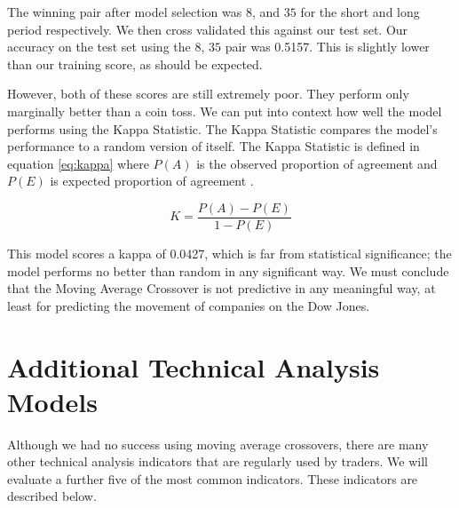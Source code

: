 \documentclass{report}
\begin{document}
The winning pair after model selection was $8$, and $35$ for the short and long period respectively. We then cross validated this against our test set. Our accuracy on the test set using the $8$, $35$ pair was 0.5157. This is slightly lower than our training score, as should be expected. 

However, both of these scores are still extremely poor. They perform only marginally better than a coin toss. We can put into context how well the model performs using the Kappa Statistic. The Kappa Statistic compares the model's performance to a random version of itself. The Kappa Statistic is defined in equation \ref{eq:kappa} where $P(A)$ is the observed proportion of agreement and $P(E)$ is expected proportion of agreement \cite{cunningham2009more}.

  \begin{figure}[H]
  \begin{center}
      \begin{equation}
        K = \dfrac{P(A) - P(E)} {1 - P(E)}
        \label{eq:kappa}
      \end{equation}
  \end{center}
  \end{figure} 

This model scores a kappa of 0.0427, which is far from statistical significance; the model performs no better than random in any significant way. We must conclude that the Moving Average Crossover is not predictive in any meaningful way, at least for predicting the movement of companies on the Dow Jones.

\section{Additional Technical Analysis Models}

Although we had no success using moving average crossovers, there are many other technical analysis indicators that are regularly used by traders. We will evaluate a further five of the most common indicators. These indicators are described below.
\end{document}
